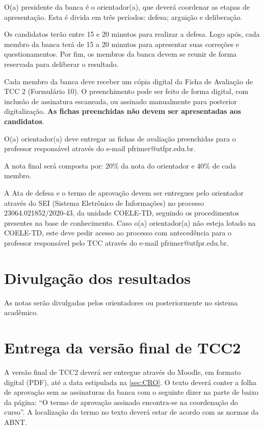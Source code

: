 \documentclass[a4paper, 12pt]{article}
\begin{document}
	O(a) presidente da banca é o orientador(a), que deverá coordenar as etapas de apresentação. Esta é divida em três períodos: defesa; arguição e deliberação. 
	
	Os candidatos terão entre 15 e 20 minutos para realizar a defesa. Logo após, cada membro da banca terá de 15 a 20 minutos para apresentar suas correções e questionamentos. Por fim, os membros da banca devem se reunir de forma reservada para deliberar o resultado.
	
	Cada membro da banca deve receber um cópia digital da Ficha de Avaliação de TCC 2 (Formulário 10). O preenchimento pode ser feito de forma digital, com inclusão de assinatura escaneada, ou assinado manualmente para posterior digitalização. \textbf{As fichas preenchidas não devem ser apresentadas aos candidatos}.
	
	O(a) orientador(a) deve entregar as fichas de avaliação preenchidas para o professor responsável através do e-mail pfrimer@utfpr.edu.br.
	
	A nota final será composta por: 20\% da nota do orientador e 40\% de cada membro.
	
	A Ata de defesa e o termo de aprovação devem ser entregues pelo orientador através do SEI (Sistema Eletrônico de Informações) no processo 23064.021852/2020-43, da unidade COELE-TD, seguindo os procedimentos presentes na base de conhecimento. Caso o(a) orientador(a) não esteja lotado na COELE-TD, este deve pedir acesso ao processo com antecedência para o professor responsável pelo TCC através do e-mail pfrimer@utfpr.edu.br.	
	
	
	\section{Divulgação dos resultados}
	
	As notas serão divulgadas pelos orientadores ou posteriormente no sistema acadêmico.
	
	\section{Entrega da versão final de TCC2}
	
	A versão final de TCC2 deverá ser entregue através do Moodle, em formato digital (PDF), até a data estipulada na \ref{sec:CRO}. O texto deverá conter a folha de aprovação sem as assinaturas da banca com o seguinte dizer na parte de baixo da página: “O termo de aprovação assinado encontra-se na coordenação do curso”. A localização do termo no texto deverá estar de acordo com as normas da ABNT.
	
\end{document}
